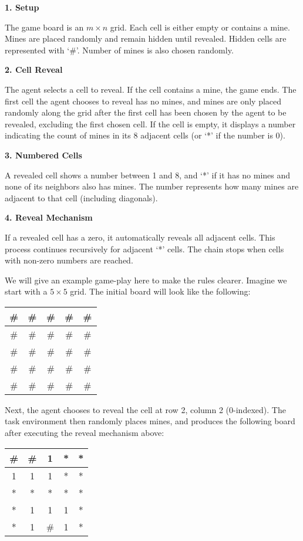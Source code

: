 \textbf{1. Setup}

The game board is an $m \times n$ grid. Each cell is either empty or contains a mine. Mines are placed randomly and remain hidden until revealed. Hidden cells are represented with `\#'. Number of mines is also chosen randomly.

\textbf{2. Cell Reveal}

The agent selects a cell to reveal. If the cell contains a mine, the game ends. The first cell the agent chooses to reveal has no mines, and mines are only placed randomly along the grid after the first cell has been chosen by the agent to be revealed, excluding the first chosen cell. If the cell is empty, it displays a number indicating the count of mines in its 8 adjacent cells (or `*' if the number is 0).


\textbf{3. Numbered Cells}

A revealed cell shows a number between 1 and 8, and `*' if it has no mines and none of its neighbors also has mines. The number represents how many mines are adjacent to that cell (including diagonals).

\textbf{4. Reveal Mechanism}

If a revealed cell has a zero, it automatically reveals all adjacent cells. This process continues recursively for adjacent `*' cells. The chain stops when cells with non-zero numbers are reached.

We will give an example game-play here to make the rules clearer. Imagine we start with a $5 \times 5$ grid. The initial board will look like the following:

\begin{table}[h]
\centering
\begin{tabular}{|c|c|c|c|c|}
\hline
\# & \# & \# & \# & \# \\
\hline
\# & \# & \# & \# & \# \\
\hline
\# & \# & \# & \# & \# \\
\hline
\# & \# & \# & \# & \# \\
\hline
\# & \# & \# & \# & \# \\
\hline
\end{tabular}
\end{table}

Next, the agent chooses to reveal the cell at row 2, column 2 (0-indexed). The task environment then randomly places mines, and produces the following board after executing the reveal mechanism above:

\begin{table}[h]
\centering
\begin{tabular}{|c|c|c|c|c|}
\hline
\# & \# & 1 & * & * \\
\hline
1 & 1 & 1 & * & * \\
\hline
* & * & * & * & * \\
\hline
* & 1 & 1 & 1 & * \\
\hline
* & 1 & \# & 1 & * \\
\hline
\end{tabular}
\end{table}

